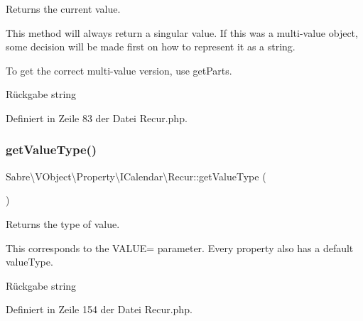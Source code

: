 Returns the current value.

This method will always return a singular value. If this was a multi-\/value object, some decision will be made first on how to represent it as a string.

To get the correct multi-\/value version, use get\+Parts.

\begin{DoxyReturn}{Rückgabe}
string 
\end{DoxyReturn}


Definiert in Zeile 83 der Datei Recur.\+php.

\mbox{\label{class_sabre_1_1_v_object_1_1_property_1_1_i_calendar_1_1_recur_a1bbe19da553096871b53a99c9330e478}} 
\subsubsection{\texorpdfstring{get\+Value\+Type()}{getValueType()}}
{\footnotesize\ttfamily Sabre\textbackslash{}\+V\+Object\textbackslash{}\+Property\textbackslash{}\+I\+Calendar\textbackslash{}\+Recur\+::get\+Value\+Type (\begin{DoxyParamCaption}{ }\end{DoxyParamCaption})}

Returns the type of value.

This corresponds to the V\+A\+L\+UE= parameter. Every property also has a \textquotesingle{}default\textquotesingle{} value\+Type.

\begin{DoxyReturn}{Rückgabe}
string 
\end{DoxyReturn}


Definiert in Zeile 154 der Datei Recur.\+php.

\mbox{\label{class_sabre_1_1_v_object_1_1_property_1_1_i_calendar_1_1_recur_ab33745d40e4c1b5153eae6a844420871}} 
